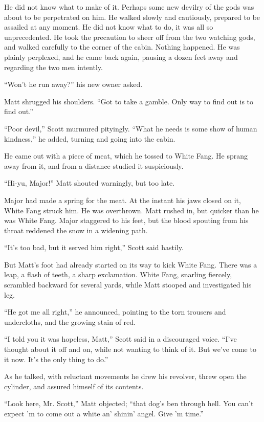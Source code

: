 \documentclass[10pt]{book}
\begin{document}
He did not know what to make of it. Perhaps some new devilry of the
gods was about to be perpetrated on him. He walked slowly and
cautiously, prepared to be assailed at any moment. He did not know what
to do, it was all so unprecedented. He took the precaution to sheer off
from the two watching gods, and walked carefully to the corner of the
cabin. Nothing happened. He was plainly perplexed, and he came back
again, pausing a dozen feet away and regarding the two men intently.

“Won’t he run away?” his new owner asked.

Matt shrugged his shoulders. “Got to take a gamble. Only way to find
out is to find out.”

“Poor devil,” Scott murmured pityingly. “What he needs is some show of
human kindness,” he added, turning and going into the cabin.

He came out with a piece of meat, which he tossed to White Fang. He
sprang away from it, and from a distance studied it suspiciously.

“Hi-yu, Major!” Matt shouted warningly, but too late.

Major had made a spring for the meat. At the instant his jaws closed on
it, White Fang struck him. He was overthrown. Matt rushed in, but
quicker than he was White Fang. Major staggered to his feet, but the
blood spouting from his throat reddened the snow in a widening path.

“It’s too bad, but it served him right,” Scott said hastily.

But Matt’s foot had already started on its way to kick White Fang.
There was a leap, a flash of teeth, a sharp exclamation. White Fang,
snarling fiercely, scrambled backward for several yards, while Matt
stooped and investigated his leg.

“He got me all right,” he announced, pointing to the torn trousers and
undercloths, and the growing stain of red.

“I told you it was hopeless, Matt,” Scott said in a discouraged voice.
“I’ve thought about it off and on, while not wanting to think of it.
But we’ve come to it now. It’s the only thing to do.”

As he talked, with reluctant movements he drew his revolver, threw open
the cylinder, and assured himself of its contents.

“Look here, Mr. Scott,” Matt objected; “that dog’s ben through hell.
You can’t expect ’m to come out a white an’ shinin’ angel. Give ’m
time.”
\end{document}

